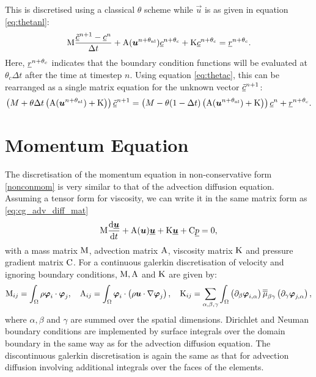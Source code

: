 This is discretised using a classical $\theta$ scheme while $\vec u$ is as
given in equation \eqref{eq:thetanl}:
\begin{equation}
  \mathrm{M} \frac{\underline{\tilde c}^{n+1}-\underline{c}^{n}}{\Delta t}
  +\mathrm{A}({\mbox{\boldmath$u$}}^{n+\theta_{\mathrm{nl}}})\underline{c}^{n+\theta_c}+\mathrm{K}\underline{c}^{n+\theta_c}=\underline{r}^{n+\theta_c}.
\end{equation}
Here, $\underline{r}^{n+\theta_c}$ indicates that the boundary condition
functions will be evaluated at $\theta_c\Delta t$ after the time at timestep
$n$. Using equation \eqref{eq:thetac}, this can be rearranged as a single
matrix equation for the unknown vector $\underline{\tilde c}^{n+1}$:
\begin{equation}
  \left(M+\theta\Delta t\left(\mathrm{A}({\mbox{\boldmath$u$}}^{n+\theta_{\mathrm{nl}}})+\mathrm{K}\right)\right)\underline{\tilde c}^{n+1}
  =\left(M-\theta(1-\Delta
    t)\left(\mathrm{A}({\mbox{\boldmath$u$}}^{n+\theta_{\mathrm{nl}}})+\mathrm{K}\right)\right)\underline{c}^{n} +\underline{r}^{n+\theta_c}.
\end{equation}

\section{Momentum Equation}
\label{Sect:ND_momentum_equation}
The discretisation of the momentum equation in non-conservative 
form \eqref{nonconmom} is very similar to that of the advection 
diffusion equation. Assuming a tensor form for viscosity, we 
can write it in the same matrix form as
\eqref{eq:cg_adv_diff_mat}
\begin{equation}\label{eq:momentum_equation}
  \mathrm{M} \frac{\mathrm{d}\underline{{\mbox{\boldmath$u$}}}}{\mathrm{d} t}
    +\mathrm{A}({\mbox{\boldmath$u$}})\underline{{\mbox{\boldmath$u$}}}+\mathrm{K}\underline{{\mbox{\boldmath$u$}}}
    +\mathrm{C} \underline{p}
    =0,
\end{equation}
with a mass matrix $\mathrm{M}$, advection matrix $\mathrm{A}$,
viscosity matrix $\mathrm{K}$ and pressure gradient matrix $\mathrm{C}$.
For a continuous galerkin discretisation of 
velocity and ignoring boundary conditions, $\mathrm{M}, \mathrm{A}$ and $\mathrm{K}$
are given by:
\begin{equation}
  \mathrm{M}_{ij}=\int_\Omega \rho{\mbox{\boldmath$\varphi$}}_i\cdot{\mbox{\boldmath$\varphi$}}_j, \quad
  \mathrm{A}_{ij}=\int_\Omega {\mbox{\boldmath$\varphi$}}_i\cdot\left(\rho{\mbox{\boldmath$u$}}\cdot\nabla {\mbox{\boldmath$\varphi$}}_j\right), \quad
  \mathrm{K}_{ij}=\sum_{\alpha,\beta,\gamma} \int_\Omega 
    \left(\partial_\beta{\mbox{\boldmath$\varphi$}}_{i,\alpha}\right) \overline{\overline{\mu}}_{\beta\gamma}
      \left(\partial_\gamma {\mbox{\boldmath$\varphi$}}_{j,\alpha}\right),
\end{equation}
where $\alpha,\beta$ and $\gamma$ are summed over the spatial dimensions.
Dirichlet and Neuman boundary conditions are implemented by 
surface integrals over the domain boundary in the same way 
as for the advection diffusion equation. The discontinuous galerkin
discretisation is again the same as that for advection diffusion 
involving additional integrals over the faces of the elements.

